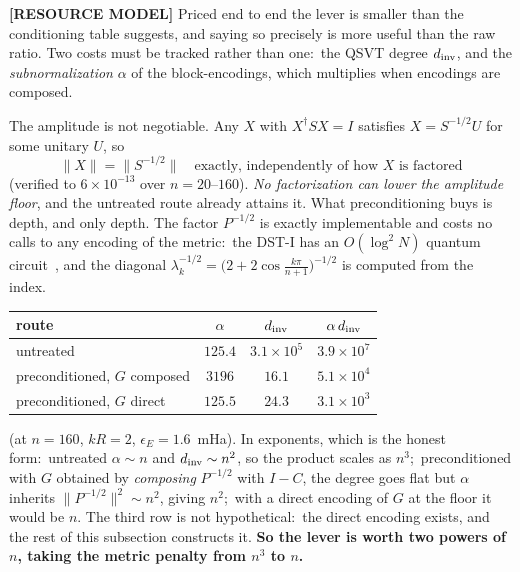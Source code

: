 \documentclass[aps,pra,twocolumn,superscriptaddress,longbibliography]{revtex4-2}
\begin{document}
\textbf{[RESOURCE MODEL]} Priced end to end the lever is smaller than the
conditioning table suggests, and saying so precisely is more useful than the
raw ratio.  Two costs must be tracked rather than one:\ the QSVT degree
$d_{\rm inv}$, and the \emph{subnormalization} $\alpha$ of the block-encodings,
which multiplies when encodings are composed.

The amplitude is not negotiable.  Any $X$ with $X^\dagger SX=I$ satisfies
$X=S^{-1/2}U$ for some unitary $U$, so
\begin{equation}
\|X\|=\|S^{-1/2}\|\quad\text{exactly, independently of how $X$ is factored}
\label{eq:amplitude_floor}
\end{equation}
(verified to $6\times10^{-13}$ over $n=20$--$160$).  \emph{No factorization can
lower the amplitude floor}, and the untreated route already attains it.  What
preconditioning buys is depth, and only depth.  The factor $P^{-1/2}$ is exactly
implementable and costs no calls to any encoding of the metric:\ the DST-I has an
$O(\log^2N)$ quantum circuit~\cite{klappenecker2001}, and the diagonal
$\lambda_k^{-1/2}=\bigl(2+2\cos\tfrac{k\pi}{n+1}\bigr)^{-1/2}$ is computed from
the index.
\begin{center}
\begin{tabular}{lccc}
\toprule
route & $\alpha$ & $d_{\rm inv}$ & $\alpha\,d_{\rm inv}$\\
\midrule
untreated                     & $125.4$  & $3.1\times10^{5}$ & $3.9\times10^{7}$\\
preconditioned, $G$ composed  & $3196$   & $16.1$            & $5.1\times10^{4}$\\
preconditioned, $G$ direct    & $125.5$  & $24.3$            & $3.1\times10^{3}$\\
\bottomrule
\end{tabular}
\end{center}
\noindent(at $n=160$, $kR=2$, $\epsilon_E=1.6$~mHa).  In exponents, which is the
honest form:\ untreated $\alpha\sim n$ and $d_{\rm inv}\sim n^{2}$, so the
product scales as $n^{3}$;\ preconditioned with $G$ obtained by \emph{composing}
$P^{-1/2}$ with $I-C$, the degree goes flat but $\alpha$ inherits
$\|P^{-1/2}\|^{2}\sim n^{2}$, giving $n^{2}$;\ with a direct encoding of $G$ at
the floor it would be $n$.  The third row is not hypothetical:\ the direct
encoding exists, and the rest of this subsection constructs it.  \textbf{So the
lever is worth two powers of $n$, taking the metric penalty from $n^{3}$ to
$n$.}
\end{document}
